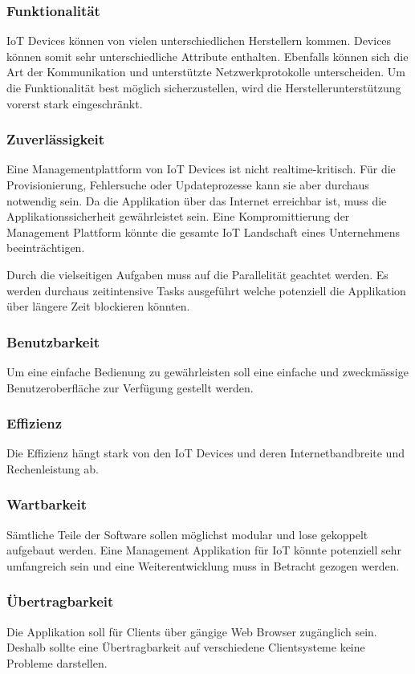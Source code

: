 \subsubsection{Funktionalität}
IoT Devices können von vielen unterschiedlichen Herstellern kommen. Devices können somit sehr unterschiedliche Attribute enthalten. Ebenfalls können sich die Art der Kommunikation und unterstützte Netzwerkprotokolle unterscheiden. Um die Funktionalität best möglich sicherzustellen, wird die Herstellerunterstützung vorerst stark eingeschränkt.
\subsubsection{Zuverlässigkeit}
Eine Managementplattform von IoT Devices ist nicht realtime-kritisch. Für die Provisionierung, Fehlersuche oder Updateprozesse kann sie aber durchaus notwendig sein. Da die Applikation über das Internet erreichbar ist, muss die Applikationssicherheit gewährleistet sein. Eine Kompromittierung der Management Plattform könnte die gesamte IoT Landschaft eines Unternehmens beeinträchtigen. 

Durch die vielseitigen Aufgaben muss auf die Parallelität geachtet werden. Es werden durchaus zeitintensive Tasks ausgeführt welche potenziell die Applikation über längere Zeit blockieren könnten.
\subsubsection{Benutzbarkeit}
Um eine einfache Bedienung zu gewährleisten soll eine einfache und zweckmässige Benutzeroberfläche zur Verfügung gestellt werden.
\subsubsection{Effizienz}
Die Effizienz hängt stark von den IoT Devices und deren Internetbandbreite und Rechenleistung ab. 
\subsubsection{Wartbarkeit}
Sämtliche Teile der Software sollen möglichst modular und lose gekoppelt aufgebaut werden. Eine Management Applikation für IoT könnte potenziell sehr umfangreich sein und eine Weiterentwicklung muss in Betracht gezogen werden. 
\subsubsection{Übertragbarkeit}
Die Applikation soll für Clients über gängige Web Browser zugänglich sein. Deshalb sollte eine Übertragbarkeit auf verschiedene Clientsysteme keine Probleme darstellen.
